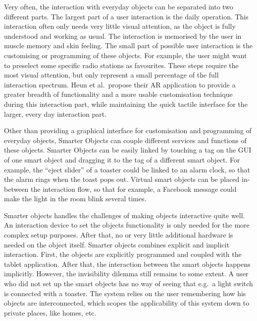 Very often, the interaction with everyday objects can be separated into two different parts. 
The largest part of a user interaction is the daily operation. 
This interaction often only needs very little visual attention, as the object is fully understood and working as usual. 
The interaction is memorised by the user in muscle memory and skin feeling. 
The small part of possible user interaction is the customising or programming of these objects. 
For example, the user might want to preselect some specific radio stations as favourites. 
These steps require the most visual attention, but only represent a small percentage of the full interaction spectrum. Heun et al.\ propose their AR application to provide a greater breadth of functionality and a more usable customisation technique during this interaction part, while maintaining the quick tactile interface for the larger, every day interaction part.

Other than providing a graphical interface for customisation and programming of everyday objects, Smarter Objects can couple different services and functions of these objects.
Smarter Objects can be easily linked by touching a tag on the GUI of one smart object and dragging it to the tag of a different smart object.
For example, the ``eject slider'' of a toaster could be linked to an alarm clock, so that the alarm rings when the toast pops out. 
Virtual smart objects can be placed in-between the interaction flow, so that for example, a Facebook message could make the light in the room blink several times.

Smarter objects handles the challenges of making objects interactive quite well. 
An interaction device to set the objects functionality is only needed for the more complex setup purposes. 
After that, no or very little additional hardware is needed on the object itself.
Smarter objects combines explicit and implicit interaction.
First, the objects are explicitly programmed and coupled with the tablet application.
After that, the interaction between the smart objects happens implicitly. 
However, the invisibility dilemma still remains to some extent.
A user who did not set up the smart objects has no way of seeing that e.g.\ a light switch is connected with a toaster.
The system relies on the user remembering how his objects are interconnected, which scopes the applicability of this system down to private places, like homes, etc.

